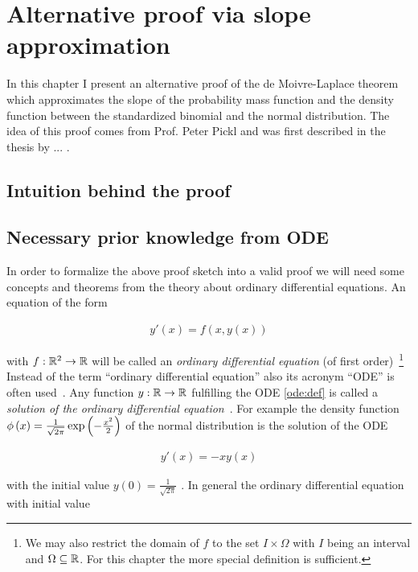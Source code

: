 \chapter{Alternative proof via slope approximation}

In this chapter I present an alternative proof of the de Moivre-Laplace theorem which approximates the slope of the probability mass function and the density function between the standardized binomial and the normal distribution. The idea of this proof comes from Prof. Peter Pickl and was first described in the thesis by ... .

\section{Intuition behind the proof}

\section{Necessary prior knowledge from ODE}

In order to formalize the above proof sketch into a valid proof we will need some concepts and theorems from the theory about ordinary differential equations. An equation of the form

\begin{align} \label{ode:def}
  y'(x) = f(x,y(x))
\end{align}

with $f:\mathbb R^2 \to \mathbb R$ will be called an \emph{ordinary differential equation} (of first order)~\cite[p. 465]{stoer}\cite{wiki:ode}\footnote{We may also restrict the domain of $f$ to the set $I\times \Omega$ with $I$ being an interval and $\Omega\subseteq \mathbb R$. For this chapter the more special definition is sufficient.} Instead of the term ``ordinary differential equation'' also its acronym ``ODE'' is often used~\cite[p. 2]{ricardo}\cite{wiki:ode}. Any function $y:\mathbb R\to\mathbb R$ fulfilling the ODE \eqref{ode:def} is called a \emph{solution of the ordinary differential equation}~\cite[p. 8]{ricardo}\cite{wiki:ode}. For example the density function $\phi\left( {x} \right) = \frac{1}{\sqrt{2\pi}} \exp\left( {-\frac{x^2}2} \right)$ of the normal distribution is the solution of the ODE

\begin{align}
  y'(x) = -xy(x)
\end{align}

with the initial value $y(0) = \frac{1}{\sqrt{2\pi}}$ . In general the ordinary differential equation with initial value

